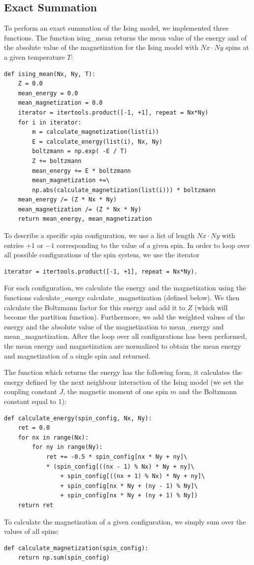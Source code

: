 \documentclass[a4paper,10pt,bibtotoc]{scrartcl}
\begin{document}
\subsection{Exact Summation}
To perform an exact summation of the Ising model, we implemented three functions. 
The function ising\_mean returns the mean value of the energy and of the absolute value of the magnetization for the Ising model with $Nx\cdot Ny$ spins at a given temperature $T$:
\begin{lstlisting}
def ising_mean(Nx, Ny, T):
    Z = 0.0
    mean_energy = 0.0
    mean_magnetization = 0.0
    iterator = itertools.product([-1, +1], repeat = Nx*Ny)
    for i in iterator:
        m = calculate_magnetization(list(i))
        E = calculate_energy(list(i), Nx, Ny)
        boltzmann = np.exp( -E / T)
        Z += boltzmann
        mean_energy += E * boltzmann
        mean_magnetization +=\
        np.abs(calculate_magnetization(list(i))) * boltzmann
    mean_energy /= (Z * Nx * Ny)
    mean_magnetization /= (Z * Nx * Ny)
    return mean_energy, mean_magnetization
\end{lstlisting}
To describe a specific spin configuration, we use a list of length $Nx\cdot Ny$ with entries $+1$ or $-1$ corresponding to the value of a given spin.
In order to loop over all possible configurations of the spin system, we use the iterator
\begin{lstlisting}
iterator = itertools.product([-1, +1], repeat = Nx*Ny).
\end{lstlisting}
For each configuration, we calculate the energy and the magnetization using the functions calculate\_energy calculate\_magnetization (defined below).
We then calculate the Boltzmann factor for this energy and add it to $Z$ (which will become the partition function).
Furthermore, we add the weighted values of the energy and the absolute value of the magnetization to mean\_energy and mean\_magnetization.
After the loop over all configurations has been performed, the mean energy and magnetization are normalized to obtain the mean energy and magnetization of a single spin and returned.

The function which returns the energy has the following form, it calculates the energy defined by the next neighbour interaction of the Ising model (we set the coupling constant $J$, the magnetic moment of one spin $m$ and the Boltzmann constant equal to 1):
\begin{lstlisting}
def calculate_energy(spin_config, Nx, Ny):
    ret = 0.0
    for nx in range(Nx):
        for ny in range(Ny):
            ret += -0.5 * spin_config[nx * Ny + ny]\
            * (spin_config[((nx - 1) % Nx) * Ny + ny]\
                + spin_config[((nx + 1) % Nx) * Ny + ny]\
                + spin_config[nx * Ny + (ny - 1) % Ny]\
                + spin_config[nx * Ny + (ny + 1) % Ny])
    return ret
\end{lstlisting}
To calculate the magnetization of a given configuration, we simply sum over the values of all spins:
\begin{lstlisting}
def calculate_magnetization(spin_config):
    return np.sum(spin_config)
\end{lstlisting}
\end{document}
